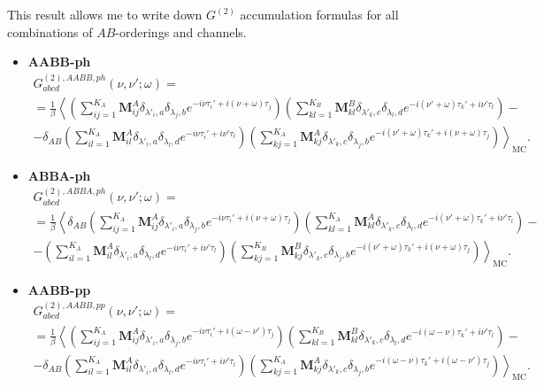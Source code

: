 \documentclass[a4paper,12pt]{article}
\renewcommand{\t}{\ensuremath{\tau}}
\newcommand{\w}{\ensuremath{\omega}}
\begin{document}
This result allows me to write down $G^{(2)}$ accumulation formulas for all combinations
of $AB$-orderings and channels.

\begin{itemize}
	\item \textbf{AABB-ph}
	\begin{multline}
		G^{(2),AABB,ph}_{abcd}(\nu,\nu';\w) =\\= \frac{1}{\beta}\left\langle
			\left(\sum_{ij=1}^{K_A} \mathbf{M}^A_{ij}
				\delta_{\lambda'_i,a} \delta_{\lambda_j,b}
				e^{-i\nu\t_i'+i(\nu+\w)\t_j}
			\right)
			\left(\sum_{kl=1}^{K_B} \mathbf{M}^B_{kl}
				\delta_{\lambda'_k,c} \delta_{\lambda_l,d}
				e^{-i(\nu'+\w)\t_k'+i\nu'\t_l}
			\right) -\right.\\\left.-\delta_{AB}
			\left(\sum_{il=1}^{K_A} \mathbf{M}^A_{il}
				\delta_{\lambda'_i,a} \delta_{\lambda_l,d}
				e^{-i\nu\t_i'+i\nu'\t_l}
			\right)
			\left(\sum_{kj=1}^{K_A} \mathbf{M}^A_{kj}
				\delta_{\lambda'_k,c} \delta_{\lambda_j,b}
				e^{-i(\nu'+\w)\t_k'+i(\nu+\w)\t_j}
			\right)
		\right\rangle_\mathrm{MC}.
	\end{multline}

	\item \textbf{ABBA-ph}
	\begin{multline}
		G^{(2),ABBA,ph}_{abcd}(\nu,\nu';\w) =\\= \frac{1}{\beta}\left\langle
			\delta_{AB}
			\left(\sum_{ij=1}^{K_A} \mathbf{M}^A_{ij}
				\delta_{\lambda'_i,a} \delta_{\lambda_j,b}
				e^{-i\nu\t_i'+i(\nu+\w)\t_j}
			\right)
			\left(\sum_{kl=1}^{K_A} \mathbf{M}^A_{kl}
				\delta_{\lambda'_k,c} \delta_{\lambda_l,d}
				e^{-i(\nu'+\w)\t_k'+i\nu'\t_l}
			\right) -\right.\\\left.-
			\left(\sum_{il=1}^{K_A} \mathbf{M}^A_{il}
				\delta_{\lambda'_i,a} \delta_{\lambda_l,d}
				e^{-i\nu\t_i'+i\nu'\t_l}
			\right)
			\left(\sum_{kj=1}^{K_B} \mathbf{M}^B_{kj}
				\delta_{\lambda'_k,c} \delta_{\lambda_j,b}
				e^{-i(\nu'+\w)\t_k'+i(\nu+\w)\t_j}
			\right)
			\right\rangle_\mathrm{MC}.
	\end{multline}

	\item \textbf{AABB-pp}
	\begin{multline}
	G^{(2),AABB,pp}_{abcd}(\nu,\nu';\w) =\\= \frac{1}{\beta}\left\langle
		\left(\sum_{ij=1}^{K_A} \mathbf{M}^A_{ij}
			\delta_{\lambda'_i,a} \delta_{\lambda_j,b}
			e^{-i\nu\t_i'+i(\w-\nu')\t_j}
		\right)
		\left(\sum_{kl=1}^{K_B} \mathbf{M}^B_{kl}
			\delta_{\lambda'_k,c} \delta_{\lambda_l,d}
			e^{-i(\w-\nu)\t_k'+i\nu'\t_l}
		\right) -\right.\\\left.-\delta_{AB}
		\left(\sum_{il=1}^{K_A} \mathbf{M}^A_{il}
			\delta_{\lambda'_i,a} \delta_{\lambda_l,d}
			e^{-i\nu\t_i'+i\nu'\t_l}
		\right)
		\left(\sum_{kj=1}^{K_A} \mathbf{M}^A_{kj}
			\delta_{\lambda'_k,c} \delta_{\lambda_j,b}
			e^{-i(\w-\nu)\t_k'+i(\w-\nu')\t_j}
		\right)
		\right\rangle_\mathrm{MC}.
	\end{multline}


\end{itemize}
\end{document}
